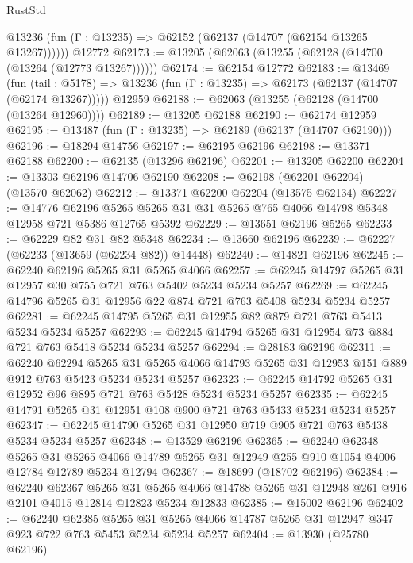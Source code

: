 \begin{lexlean}{RustStd}
\begin{coremodule}
      @13236 (fun (Γ : @13235) => @62152 (@62137 (@14707 (@62154 @13265 @13267))))))
    @12772
@62173 := @13205 (@62063 (@13255 (@62128 (@14700 (@13264 (@12773 @13267))))))
@62174 := @62154 @12772
@62183 := @13469
    (fun (tail : @5178) => @13236 (fun (Γ : @13235) => @62173 (@62137 (@14707 (@62174 @13267)))))
    @12959
@62188 := @62063 (@13255 (@62128 (@14700 (@13264 @12960))))
@62189 := @13205 @62188
@62190 := @62174 @12959
@62195 := @13487 (fun (Γ : @13235) => @62189 (@62137 (@14707 @62190)))
@62196 := @18294 @14756
@62197 := @62195 @62196
@62198 := @13371 @62188
@62200 := @62135 (@13296 @62196)
@62201 := @13205 @62200
@62204 := @13303 @62196 @14706 @62190
@62208 := @62198 (@62201 @62204) (@13570 @62062)
@62212 := @13371 @62200 @62204 (@13575 @62134)
@62227 := @14776
    @62196
    @5265
    @5265
    @31
    @31
    @5265
    @765
    @4066
    @14798
    @5348
    @12958
    @721
    @5386
    @12765
    @5392
@62229 := @13651 @62196 @5265
@62233 := @62229 @82 @31 @82 @5348
@62234 := @13660 @62196
@62239 := @62227 (@62233 (@13659 (@62234 @82)) @14448)
@62240 := @14821 @62196
@62245 := @62240 @62196 @5265 @31 @5265 @4066
@62257 := @62245 @14797 @5265 @31 @12957 @30 @755 @721 @763 @5402 @5234 @5234 @5257
@62269 := @62245 @14796 @5265 @31 @12956 @22 @874 @721 @763 @5408 @5234 @5234 @5257
@62281 := @62245 @14795 @5265 @31 @12955 @82 @879 @721 @763 @5413 @5234 @5234 @5257
@62293 := @62245 @14794 @5265 @31 @12954 @73 @884 @721 @763 @5418 @5234 @5234 @5257
@62294 := @28183 @62196
@62311 := @62240
    @62294
    @5265
    @31
    @5265
    @4066
    @14793
    @5265
    @31
    @12953
    @151
    @889
    @912
    @763
    @5423
    @5234
    @5234
    @5257
@62323 := @62245 @14792 @5265 @31 @12952 @96 @895 @721 @763 @5428 @5234 @5234 @5257
@62335 := @62245 @14791 @5265 @31 @12951 @108 @900 @721 @763 @5433 @5234 @5234 @5257
@62347 := @62245 @14790 @5265 @31 @12950 @719 @905 @721 @763 @5438 @5234 @5234 @5257
@62348 := @13529 @62196
@62365 := @62240
    @62348
    @5265
    @31
    @5265
    @4066
    @14789
    @5265
    @31
    @12949
    @255
    @910
    @1054
    @4006
    @12784
    @12789
    @5234
    @12794
@62367 := @18699 (@18702 @62196)
@62384 := @62240
    @62367
    @5265
    @31
    @5265
    @4066
    @14788
    @5265
    @31
    @12948
    @261
    @916
    @2101
    @4015
    @12814
    @12823
    @5234
    @12833
@62385 := @15002 @62196
@62402 := @62240
    @62385
    @5265
    @31
    @5265
    @4066
    @14787
    @5265
    @31
    @12947
    @347
    @923
    @722
    @763
    @5453
    @5234
    @5234
    @5257
@62404 := @13930 (@25780 @62196)

\end{coremodule}
\end{lexlean}
